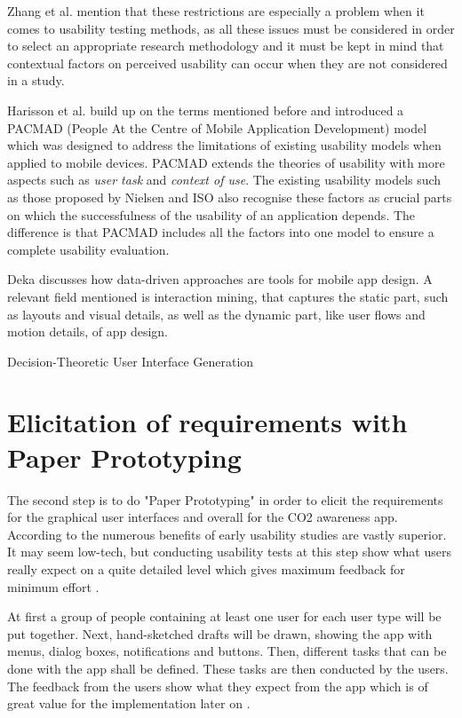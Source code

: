 Zhang et al. mention that these restrictions are especially a problem when it comes to usability testing methods, as all these issues must be considered in order to select an appropriate research methodology and it must be kept in mind that contextual factors on perceived usability can occur when they are not considered in a study.

Harisson et al. \cite{harrison2013usability} build up on the terms mentioned before and introduced a PACMAD (People At the Centre of Mobile Application Development) model which was designed to address the limitations of existing usability models when applied to mobile devices. PACMAD extends the theories of usability with more aspects such as \textit{user task} and \textit{context of use}. The existing usability models such as those proposed by Nielsen \cite{nielsen1994usability} and ISO \cite{bevan1998iso} also recognise these factors as crucial parts on which the successfulness of the usability of an application depends. The difference is that PACMAD includes all the factors into one model to ensure a complete usability evaluation.

Deka \cite{deka2016data} discusses how data-driven approaches are tools for mobile app design. A relevant field mentioned is interaction mining, that captures the static part, such as layouts and visual details, as well as the dynamic part, like user flows and motion details, of app design.

Decision-Theoretic User Interface Generation \cite{gajos2008decision}

\section{Elicitation of requirements with Paper Prototyping}
The second step is to do "Paper Prototyping" in order to elicit the requirements for the graphical user interfaces and overall for the CO2 awareness app. According to \cite{lancaster2004paper} the numerous benefits of early usability studies are vastly superior. It may seem low-tech, but conducting usability tests at this step show what users really expect on a quite detailed level which gives maximum feedback for minimum effort \cite{weiss2003handheld}.

At first a group of people containing at least one user for each user type will be put together.  Next, hand-sketched drafts will be drawn, showing the app with menus, dialog boxes, notifications and buttons. Then, different tasks that can be done with the app shall be defined. These tasks are then conducted by the users. The feedback from the users show what they expect from the app which is of great value for the implementation later on \cite{snyder2003paper}.




